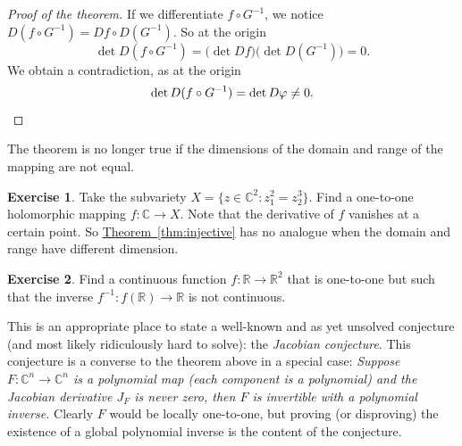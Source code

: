 \documentclass[12pt,openany]{book}
\newcommand{\C}{{\mathbb{C}}}
\newcommand{\R}{{\mathbb{R}}}
\newcommand{\myindex}[1]{#1\index{#1}}
\theoremstyle{plain}
\theoremstyle{remark}
\theoremstyle{definition}
\newenvironment{exbox}{%
    \def\FrameCommand{\vrule width 1pt \relax\hspace{10pt}}%
    \MakeFramed{\advance\hsize-\width\FrameRestore}%
}{%
    \endMakeFramed
}
\theoremstyle{exercise}
\newtheorem{exercise}{Exercise}[section]
\theoremstyle{example}
\newcommand{\thmref}[1]{\hyperref[#1]{Theorem~\ref*{#1}}}
\begin{document}
\begin{proof}[Proof of the theorem]
If we differentiate $f \circ G^{-1}$, we notice
$D(f \circ G^{-1}) = Df \circ D(G^{-1})$.
So at the origin
\begin{equation*}
\det D(f \circ G^{-1}) = \bigl(\det Df\bigr) \bigl(\det D(G^{-1})\bigr) = 0.
\end{equation*}
We obtain a contradiction, as at the origin
\begin{equation*}
\det
D(f \circ G^{-1})
= \det D\varphi \not= 0 . \qedhere
\end{equation*}
\end{proof}

The theorem is no longer true if the dimensions of the domain and range of the
mapping are not equal.

\begin{exbox}
\begin{exercise}
Take the subvariety
$X = \bigl\{ z \in \C^2 : z_1^2 = z_2^3 \bigr\}$.
Find a one-to-one holomorphic mapping $f \colon \C \to X$.
Note that the derivative of $f$ vanishes at a certain point.
So \thmref{thm:injective} has no analogue when the domain and range have
different dimension.
\end{exercise}

\begin{exercise}
Find a continuous function $f \colon \R \to \R^2$ that is one-to-one but
such that the inverse $f^{-1} \colon f(\R) \to \R$ is not continuous.
\end{exercise}
\end{exbox}

\pagebreak[1]
This is an appropriate place to state a well-known and as yet unsolved conjecture (and most
likely ridiculously hard to solve):
the \emph{\myindex{Jacobian conjecture}}.
This conjecture is a converse to the theorem above in a special case:
\emph{Suppose $F \colon \C^n \to \C^n$ is a polynomial map (each component is a
polynomial) and the Jacobian derivative $J_F$ is never zero, then $F$ is
invertible with a polynomial inverse.}
Clearly $F$ would be locally one-to-one, but proving (or
disproving)
the existence of a global polynomial inverse is the content of the conjecture.
\end{document}
